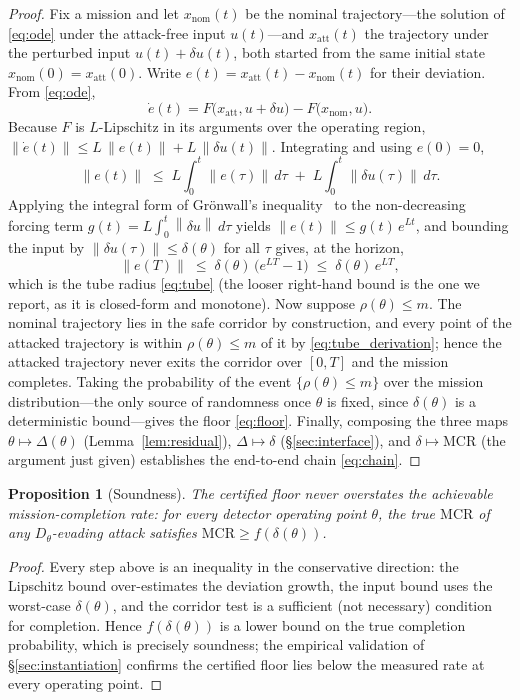 \documentclass[conference]{IEEEtran}
\newcommand{\Norm}[1]{\left\lVert #1\right\rVert}
\newcommand{\MCR}{\mathrm{MCR}}
\newtheorem{proposition}{Proposition}
\begin{document}
\begin{proof}
Fix a mission and let $x_{\mathrm{nom}}(t)$ be the nominal trajectory---the
solution of \eqref{eq:ode} under the attack-free input $u(t)$---and
$x_{\mathrm{att}}(t)$ the trajectory under the perturbed input $u(t)+\delta u(t)$,
both started from the same initial state $x_{\mathrm{nom}}(0)=x_{\mathrm{att}}(0)$.
Write $e(t)=x_{\mathrm{att}}(t)-x_{\mathrm{nom}}(t)$ for their deviation. From
\eqref{eq:ode},
\[
\dot e(t)=F\big(x_{\mathrm{att}},u+\delta u\big)-F\big(x_{\mathrm{nom}},u\big).
\]
Because $F$ is $L$-Lipschitz in its arguments over the operating region,
$\Norm{\dot e(t)}\le L\,\Norm{e(t)}+L\,\Norm{\delta u(t)}$. Integrating and using
$e(0)=0$,
\[
\Norm{e(t)}\;\le\;L\!\int_0^t\!\Norm{e(\tau)}\,d\tau
\;+\;L\!\int_0^t\!\Norm{\delta u(\tau)}\,d\tau .
\]
Applying the integral form of Grönwall's inequality~\cite{gronwall1919} to the
non-decreasing forcing term $g(t)=L\!\int_0^t\!\Norm{\delta u}\,d\tau$ yields
$\Norm{e(t)}\le g(t)\,e^{Lt}$, and bounding the input by
$\Norm{\delta u(\tau)}\le\delta(\theta)$ for all $\tau$ gives, at the horizon,
\begin{equation}
\label{eq:tube_derivation}
\Norm{e(T)}\;\le\;\delta(\theta)\,\big(e^{LT}-1\big)\;\le\;\delta(\theta)\,e^{LT},
\end{equation}
which is the tube radius \eqref{eq:tube} (the looser right-hand bound is the one
we report, as it is closed-form and monotone). Now suppose $\rho(\theta)\le m$.
The nominal trajectory lies in the safe corridor by construction, and every point
of the attacked trajectory is within $\rho(\theta)\le m$ of it by
\eqref{eq:tube_derivation}; hence the attacked trajectory never exits the
corridor over $[0,T]$ and the mission completes. Taking the probability of the
event $\{\rho(\theta)\le m\}$ over the mission distribution---the only source of
randomness once $\theta$ is fixed, since $\delta(\theta)$ is a deterministic
bound---gives the floor \eqref{eq:floor}. Finally, composing the three maps
$\theta\!\mapsto\!\Delta(\theta)$ (Lemma~\ref{lem:residual}),
$\Delta\!\mapsto\!\delta$ (\S\ref{sec:interface}), and $\delta\!\mapsto\!\MCR$
(the argument just given) establishes the end-to-end chain \eqref{eq:chain}.
\end{proof}

\begin{proposition}[Soundness]
\label{prop:sound}
The certified floor never overstates the achievable mission-completion rate:
for every detector operating point $\theta$, the true $\MCR$ of any
$D_\theta$-evading attack satisfies $\MCR\ge f(\delta(\theta))$.
\end{proposition}
\begin{proof}
Every step above is an inequality in the conservative direction: the
Lipschitz bound over-estimates the deviation growth, the input bound uses the
worst-case $\delta(\theta)$, and the corridor test is a sufficient (not
necessary) condition for completion. Hence $f(\delta(\theta))$ is a lower bound
on the true completion probability, which is precisely soundness; the empirical
validation of \S\ref{sec:instantiation} confirms the certified floor lies below
the measured rate at every operating point.
\end{proof}
\end{document}
